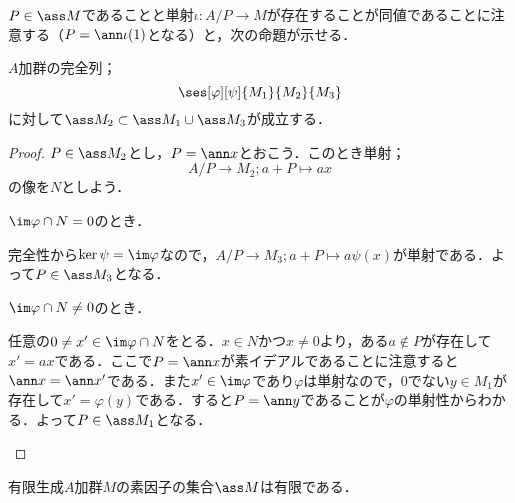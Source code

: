 $P\in\ass M$であることと単射$\iota:A/P\to M$が存在することが同値であることに注意する（$P=\ann \iota(1)$となる）と，次の命題が示せる．
\begin{prop}\label{prop:完全列とass}
	$A$加群の完全列；
	\[\ses[\varphi][\psi]{M_1}{M_2}{M_3}\]
	に対して$\ass M_2\subset \ass M_1\cup\ass M_3$が成立する．
\end{prop}
\begin{proof}
	$P\in\ass M_2$とし，$P=\ann x$とおこう．このとき単射；
	\[A/P\to M_2;a+P\mapsto ax\]
	の像を$N$としよう．
	
	\begin{sakura}
		\item $\im\varphi\cap N=0$のとき．
		
		完全性から$\ker\psi=\im\varphi$なので，$A/P\to M_3;a+P\mapsto a\psi(x)$が単射である．よって$P\in\ass M_3$となる．
		
		\item $\im\varphi\cap N\neq0$のとき．
		
		任意の$0\neq x'\in\im\varphi\cap N$をとる．$x\in N$かつ$x\neq0$より，ある$a\not\in P$が存在して$x'=ax$である．ここで$P=\ann x$が素イデアルであることに注意すると$\ann x=\ann x'$である．また$x'\in\im\varphi$であり$\varphi$は単射なので，$0$でない$y\in M_1$が存在して$x'=\varphi(y)$である．すると$P=\ann y$であることが$\varphi$の単射性からわかる．よって$P\in\ass M_1$となる．
	\end{sakura}
\end{proof}
\begin{thm}
	有限生成$A$加群$M$の素因子の集合$\ass M$は有限である．
\end{thm}
